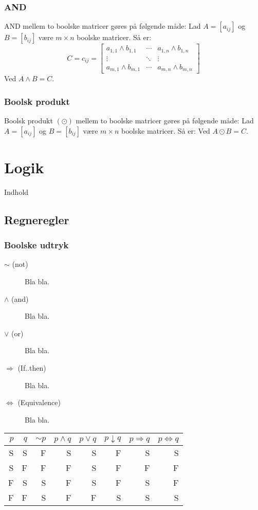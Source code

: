 \documentclass[a4paper]{article}
\begin{document}
    \subsubsection{AND}
      AND mellem to boolske matricer gøres på følgende måde:
      Lad $A = [a_{ij}]$ og $B= [b_{ij}]$ være $m \times n$ boolske matricer. Så er:
      $$
        C = c_{ij} = \begin{bmatrix}
                    a_{1,1} \wedge b_{1,1} & \cdots & a_{1,n} \wedge b_{1,n} \\
                    \vdots               & \ddots & \vdots \\
                    a_{m,1} \wedge b_{m,1} & \cdots & a_{m,n} \wedge b_{m,n}
                  \end{bmatrix}
      $$
      Ved $A \wedge B = C$.
    \subsubsection{Boolsk produkt} %
      Boolsk produkt $(\odot)$ mellem to boolske matricer gøres på følgende måde:
      Lad $A = [a_{ij}]$ og $B= [b_{ij}]$ være $m \times n$ boolske matricer. Så er:
      Ved $A \odot B = C$.
\section{Logik}
  Indhold
  \subsection{Regneregler}
    \subsubsection{Boolske udtryk}
      \begin{description}
        \item[$\sim$ (not)] Bla bla.
        \item[$\wedge$ (and)] Bla bla.
        \item[$\vee$ (or)]  Bla bla.
        \item[$\Rightarrow$ (If..then)]  Bla bla.
        \item[$\Leftrightarrow$ (Equivalence)]  Bla bla.
      \end{description}
      \begin{center}
        \begin{tabular} {|r|r||r|r|r|r|r|r|}
          \hline
          $p$ & $q$  & $\sim{}p$ &  $p\wedge{}q$ &  $p\vee{}q$ &  $p\downarrow{}q$  &  $p\Rightarrow{}q$  &  $p\Leftrightarrow{}q$ \\
          \hline
          \hline
          S&S&F&S&S&F&S&S\\
          \hline
          S&F&F&F&S&F&F&F\\
          \hline
          F&S&S&F&S&F&S&F\\
          \hline
          F&F&S&F&F&S&S&S\\
          \hline
        \end{tabular}
      \end{center}
\end{document}
